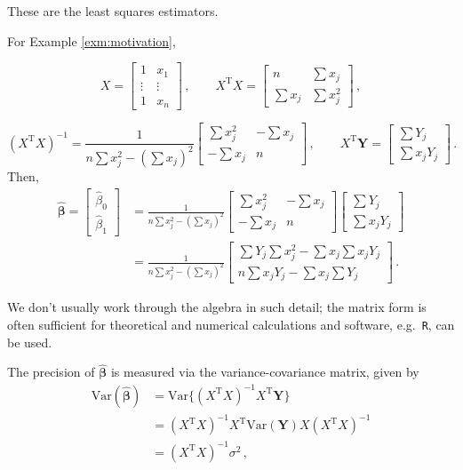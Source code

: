 \documentclass[
]{book}
\theoremstyle{definition}
\theoremstyle{definition}
\theoremstyle{definition}
\theoremstyle{definition}
\theoremstyle{remark}
\begin{document}
These are the least squares estimators.

For Example \ref{exm:motivation},

\[
X=\left[\begin{array}{cc}
1&x_{1}\\
\vdots&\vdots\\
1&x_{n}\end{array}\right]\,,
\qquad
X^{\textrm{T}}X=\left[\begin{array}{cc}
n&\sum x_j\\
\sum x_j&\sum x_j^{2}\end{array}\right]\,,
\]

\[
(X^{\textrm{T}}X)^{-1}=\frac{1}{n\sum x_j^{2}-(\sum x_j)^{2}}\left[\begin{array}{cc}
\sum x_j^{2}&-\sum x_j\\
-\sum x_j&n\end{array}\right]\,,
\qquad
X^{\textrm{T}}\boldsymbol{Y}=\left[\begin{array}{c}
\sum Y_j\\
\sum x_jY_j\end{array}\right]\,.
\]
Then,
\begin{align}
\hat{\boldsymbol{\beta}}=\left[\begin{array}{c}
\hat{\beta}_{0}\\
\hat{\beta}_{1}\end{array}\right]
& =\frac{1}{n\sum x_j^{2}-(\sum x_j)^{2}}
\left[\begin{array}{cc}
\sum x_j^{2}&-\sum x_j\\
-\sum x_j&n\end{array}\right]
\left[\begin{array}{c}
\sum Y_j\\
\sum x_jY_j\end{array}\right]\nonumber \\
&= \frac{1}{n\sum x_j^{2}-(\sum x_j)^{2}}\left[\begin{array}{c}
\sum Y_j\sum x_j^{2}-\sum x_j\sum x_jY_j\\
n\sum x_jY_j-\sum x_j\sum Y_j\end{array}\right]\,.
\end{align}

We don't usually work through the algebra in such detail; the matrix form is often sufficient for theoretical and numerical calculations and software, e.g.~\texttt{R}, can be used.

The precision of \(\hat{\boldsymbol{\beta}}\) is measured via the variance-covariance matrix, given by
\begin{align}
\textrm{Var}(\hat{\boldsymbol{\beta}}) & = \textrm{Var}\{(X^{\textrm{T}}X)^{-1}X^{\textrm{T}}\boldsymbol{Y}\}\\
& =(X^{\textrm{T}}X)^{-1}X^{\textrm{T}}\textrm{Var}(\boldsymbol{Y})X(X^{\textrm{T}}X)^{-1}\\
& = (X^{\textrm{T}}X)^{-1}\sigma^{2}\,,
\end{align}
\end{document}
